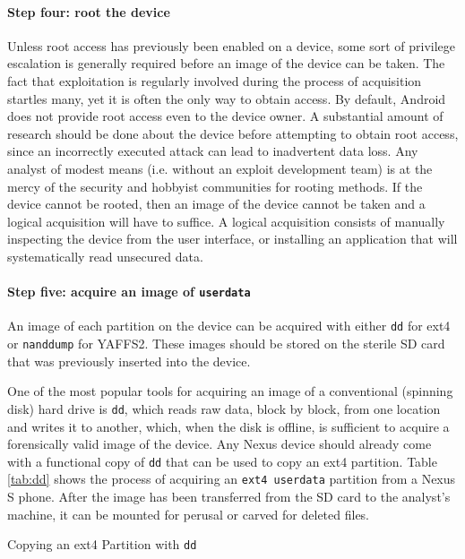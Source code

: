 \paragraph{Step four: root the device}
Unless root access has previously been enabled on a device, some sort of privilege escalation is generally required before an image
of the device can be taken. The fact that exploitation is regularly involved during the process of acquisition startles many, yet it
is often the only way to obtain access. By default, Android does not provide root access even to the device owner.  A substantial
amount of research should be done about the device before attempting to obtain root access, since an incorrectly executed attack can
lead to inadvertent data loss. Any analyst of modest means (i.e. without an exploit development team) is at the mercy of the
security and hobbyist communities for rooting methods. If the device cannot be rooted, then an image of the device cannot be taken
and a logical acquisition will have to suffice. A logical acquisition consists of manually inspecting the device from the user
interface, or installing an application that will systematically read unsecured data.

\paragraph{Step five: acquire an image of \texttt{userdata}} An image of each partition on the device can be acquired with either
\texttt{dd} for ext4 or \texttt{nanddump} for YAFFS2.  These images should be stored on the sterile SD card that was previously
inserted into the device.  

One of the most popular tools for acquiring an image of a conventional (spinning disk) hard drive is
\texttt{dd}, which reads raw data, block by block, from one location and writes it to another, which, when the disk is offline, is
sufficient to acquire a forensically valid image of the device.  Any Nexus device should already come with a functional copy of
\texttt{dd} that can be used to copy an ext4 partition.  Table \ref{tab:dd} shows the process of acquiring an \texttt{ext4 userdata}
partition from a Nexus S phone.  After the image has been transferred from the SD card to the analyst's machine, it can be mounted
for perusal or carved for deleted files.  

\begin{table}[htb]
\lstset{numbers=none}

\caption{Copying an ext4 Partition with \texttt{dd}}
\label{tab:dd}
\end{table}

